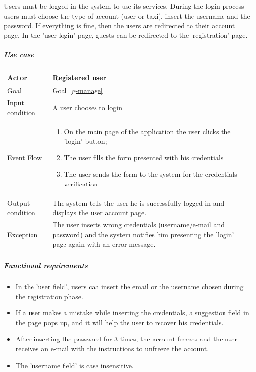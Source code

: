 Users must be logged in the system to use its services.
During the login process users must choose the type of account (user or taxi), insert the username and the password. If everything is fine, then the users are redirected to their account page.
In the 'user login' page, guests can be redirected to the 'registration' page.

\subparagraph{Use case}
\noindent
    \begin{center}
        \begin{longtable}{| l | p{} |}
            \hline
            Actor & Registered user \\
            \hline
            Goal & Goal~\ref{g-manage}
            \\
            \hline
            Input condition & A user chooses to login \\
            \hline
            Event Flow & 
                \begin{enumerate}
                	\item On the main page of the application the user clicks the 'login' button;
                	\item The user fills the form presented with his credentials;
                	\item The user sends the form to the system for the credentials verification.
            	\end{enumerate}
            \\
            \hline
            Output condition & The system tells the user he is successfully logged in and displays the user account page. \\
            \hline
            Exception & The user inserts wrong credentials (username/e-mail and password) and the system notifies him presenting the 'login' page again with an error message. \\
            \hline
        \end{longtable}
    \end{center}


\subparagraph{Functional requirements}
\noindent
	\begin{itemize}
		\item In the 'user field', users can insert the email or the username chosen during the registration phase.
		\item If a user makes a mistake while inserting the credentials, a suggestion field in the page pops up, and it will help the user to recover his credentials.
		\item After inserting the password for 3 times, the account freezes and the user receives an e-mail with the instructions to unfreeze the account.
		\item The 'username field' is case insensitive.
	\end{itemize}


